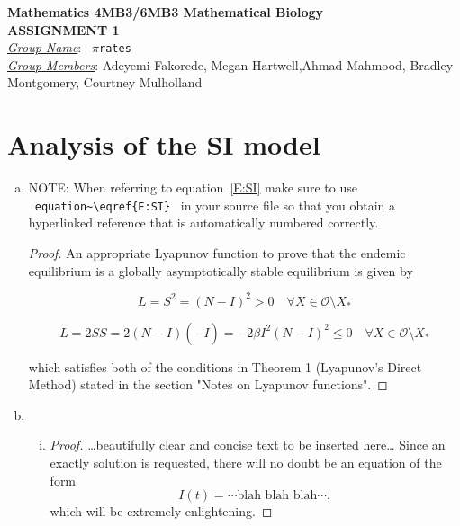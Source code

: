 \documentclass[12pt]{article}
\begin{document}
\begin{center}
{\bfseries Mathematics 4MB3/6MB3 Mathematical Biology\\
 ASSIGNMENT {\color{blue}1}}\\
\medskip
\underline{\emph{Group Name}}: \texttt{{\color{blue} $\pi$rates}}\\
\medskip
\underline{\emph{Group Members}}: {\color{blue}Adeyemi Fakorede, Megan Hartwell,Ahmad Mahmood, Bradley Montgomery, Courtney Mulholland}
\end{center}

\section{Analysis of the SI model}

\SIanalIntro
\begin{enumerate}[(a)]
\item \SIanalQa
  
  {\color{blue}
  
  		NOTE: When referring to equation~\eqref{E:SI} make sure to use ~\verb|equation~\eqref{E:SI}|~ in your source file so that you obtain a hyperlinked reference that is automatically numbered correctly.
  
    \begin{proof}
	      An appropriate Lyapunov function to prove that the endemic equilibrium is a globally asymptotically stable equilibrium is given by 
	      
	      \begin{equation}
	      	L=S^2=(N-I)^2 > 0 \quad \forall X\in\mathcal{O}\setminus{X_*}
	      \end{equation}
	      
	       \begin{equation}
	      	\dot{L}=2S\dot{S}=2(N-I)(-\dot{I})=-2\beta I^2 (N-I)^2 \leq 0 \quad \forall X\in\mathcal{O}\setminus{X_*}
	      \end{equation}
	      
	      which satisfies both of the conditions in Theorem 1 (Lyapunov's Direct Method) stated in the section "Notes on Lyapunov functions".

    \end{proof}
  }
  
\item \SIanalQb
  \begin{enumerate}[(i)]
  \item \SIanalQbi
    
    {\color{blue}
      \begin{proof}
        {\color{magenta}\dots beautifully clear and concise text to be inserted here\dots}
        Since an exactly solution is requested, there will no doubt be an equation of the form
        \begin{equation}
          I(t) = \cdots \text{blah blah blah} \cdots ,
        \end{equation}
        which will be extremely enlightening.
      \end{proof}
    }
    

\end{enumerate}
\end{enumerate}
\end{document}
